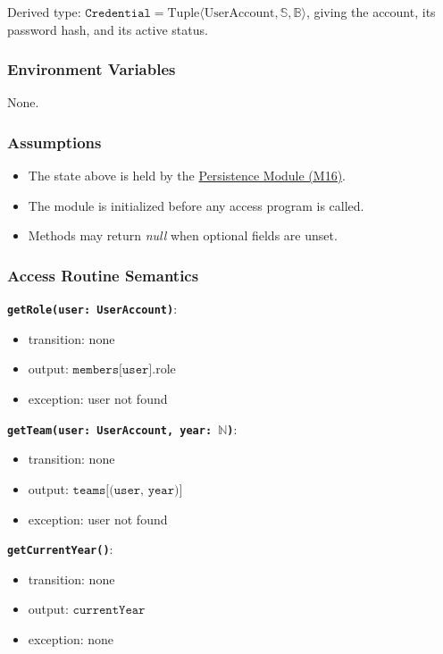\documentclass[12pt, titlepage]{article}
\begin{document}
Derived type: $\texttt{Credential} = \text{Tuple}\langle \text{UserAccount}, \mathbb{S}, \mathbb{B} \rangle$, giving the account, its password hash, and its active status.

\subsubsection{Environment Variables}
None.

\subsubsection{Assumptions}
\begin{itemize}
  \item The state above is held by the \hyperref[mPersist]{Persistence Module (M16)}.
  \item The module is initialized before any access program is called.
  \item Methods may return \textit{null} when optional fields are unset.
\end{itemize}

\subsubsection{Access Routine Semantics}

\textbf{\texttt{getRole(user: UserAccount)}}:
\begin{itemize}
  \item transition: none
  \item output: $\texttt{members[user]}.\text{role}$
  \item exception: user not found
\end{itemize}

\textbf{\texttt{getTeam(user: UserAccount, year: $\mathbb{N}$)}}:
\begin{itemize}
  \item transition: none
  \item output: $\texttt{teams[(user, year)]}$
  \item exception: user not found
\end{itemize}

\textbf{\texttt{getCurrentYear()}}:
\begin{itemize}
  \item transition: none
  \item output: $\texttt{currentYear}$
  \item exception: none
\end{itemize}
\end{document}
